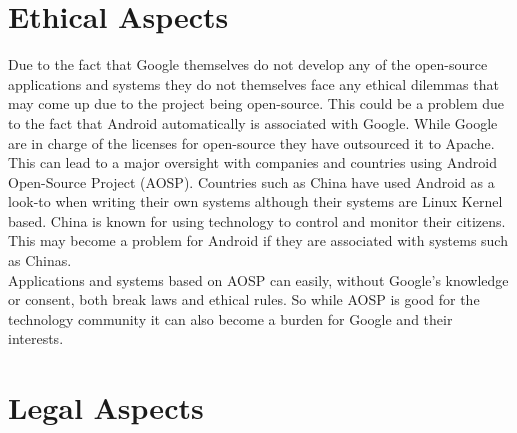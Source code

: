 \documentclass[conference]{IEEEtran}
\begin{document}
\section{Ethical Aspects}
\label{ethics}

Due to the fact that Google themselves do not develop any of the open-source applications and systems they do not themselves face any ethical dilemmas that may come up due to the project being open-source. This could be a problem due to the fact that Android automatically is associated with Google. While Google are in charge of the licenses for open-source they have outsourced it to Apache.\cite{android-licenses} This can lead to a major oversight with companies and countries using Android Open-Source Project (AOSP). Countries such as China have used Android as a look-to when writing their own systems\cite{country-license} although their systems are Linux Kernel based. China is known for using technology to control and monitor their citizens. This may become a problem for Android if they are associated with systems such as Chinas.
\\Applications and systems based on AOSP can easily, without Google's knowledge or consent, both break laws and ethical rules. So while AOSP is good for the technology community it can also become a burden for Google and their interests.


\section{Legal Aspects}
\label{legal}
\end{document}
